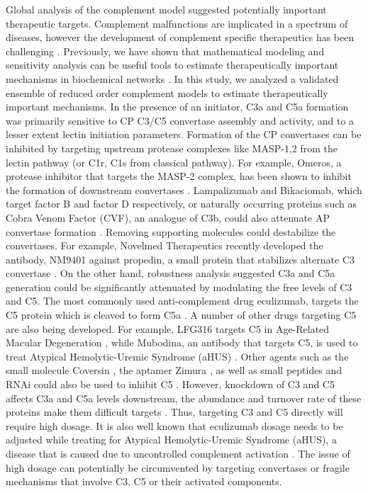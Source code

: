 \documentclass[12pt]{article}
\begin{document}
Global analysis of the complement model suggested potentially important therapeutic targets.
Complement malfunctions are implicated in a spectrum of diseases, however the
development of complement specific therapeutics has been challenging \cite{ricklin2007complement,morgan2015complement}.
Previously, we have shown that mathematical modeling and sensitivity analysis can be useful tools to estimate therapeutically important mechanisms in biochemical networks \cite{Luan:2007aa,Nayak:2008aa,Tasseff:2010aa,Rice:2016aa}.
In this study, we analyzed a validated ensemble of reduced order complement models to estimate therapeutically important mechanisms.
In the presence of an initiator, C3a and C5a formation was primarily sensitive to CP C3/C5 convertase assembly and activity, and to a lesser extent lectin initiation parameters.
Formation of the CP convertases can be inhibited by targeting upstream protease complexes like MASP-1,2 from the lectin pathway (or C1r, C1s from classical pathway).
For example, Omeros, a protease inhibitor that targets the MASP-2 complex, has been shown to inhibit the formation of downstream convertases \cite{schwaeble2011methods}.
Lampalizumab and Bikaciomab, which target factor B and factor D respectively, or naturally occurring proteins such as Cobra Venom Factor (CVF), an analogue of C3b, could also attenuate AP convertase formation \cite{vogel2004recombinant,katschke2012inhibiting, hu2013therapeutic}.
Removing supporting molecules could destabilize the convertases.
For example, Novelmed Therapeutics recently developed the antibody, NM9401 against propedin, a small protein that stabilizes alternate C3 convertase \cite{bansal2014humanized}.
On the other hand, robustness analysis suggested C3a and C5a generation could be significantly attenuated by modulating the free levels of C3 and C5.
The most commonly used anti-complement drug eculizumab, targets the C5 protein which is cleaved to form C5a \cite{morgan2015complement}.
A number of other drugs targeting C5 are also being developed. For example, LFG316 targets C5 in Age-Related Macular Degeneration \cite{roguska2014generation},
while Mubodina, an antibody that targets C5, is used to treat Atypical Hemolytic-Uremic Syndrome (aHUS) \cite{melis2015complement}.
Other agents such as the small molecule Coversin \cite{weston2014clinical}, the aptamer Zimura \cite{epstein2007complement},
as well as small peptides and RNAi could also be used to inhibit C5 \cite{borodovsky2014aln}.
However, knockdown of C3 and C5 affects C3a and C5a levels downstream, the abundance and turnover rate of these proteins make them difficult targets \cite{sissons1977metabolism, swaak1982determination}. Thus, targeting C3 and C5 directly will require high dosage. It is also well known that eculizumab dosage needs to be adjusted while treating for Atypical Hemolytic-Uremic Syndrome (aHUS), a disease that is caused due to uncontrolled complement activation \cite{noris2014dynamics}. The issue of high dosage can potentially be circumvented by targeting convertases or fragile mechanisms that involve C3, C5 or their activated components.
\end{document}
